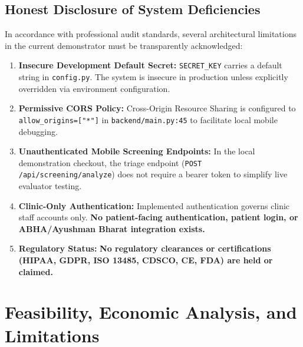 \documentclass[11pt,a4paper]{report}
\newcommand{\artifact}[1]{\nolinkurl{#1}}
\begin{document}
\section{Honest Disclosure of System Deficiencies}
In accordance with professional audit standards, several architectural limitations in the current demonstrator must be transparently acknowledged:
\begin{enumerate}
  \item \textbf{Insecure Development Default Secret:} \texttt{SECRET\_KEY} carries a default string in \artifact{config.py}. The system is insecure in production unless explicitly overridden via environment configuration.
  \item \textbf{Permissive CORS Policy:} Cross-Origin Resource Sharing is configured to \nolinkurl{allow_origins=["*"]} in \artifact{backend/main.py:45} to facilitate local mobile debugging.
  \item \textbf{Unauthenticated Mobile Screening Endpoints:} In the local demonstration checkout, the triage endpoint (\texttt{POST /api/screening/analyze}) does not require a bearer token to simplify live evaluator testing.
  \item \textbf{Clinic-Only Authentication:} Implemented authentication governs clinic staff accounts only. \textbf{No patient-facing authentication, patient login, or ABHA/Ayushman Bharat integration exists.}
  \item \textbf{Regulatory Status:} \textbf{No regulatory clearances or certifications (HIPAA, GDPR, ISO 13485, CDSCO, CE, FDA) are held or claimed.}
\end{enumerate}

\chapter{Feasibility, Economic Analysis, and Limitations}
\end{document}
